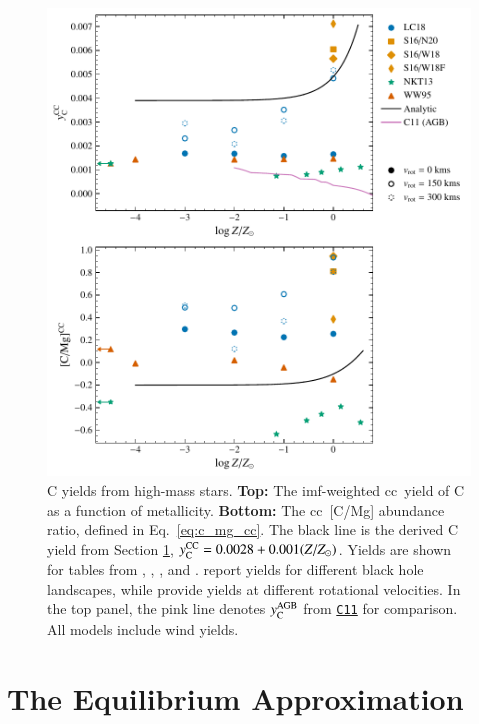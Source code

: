 \documentclass[12pt,oneside,letterpaper]{report}
\newcommand{\cc}{\gls{cc}}
\newcommand{\imf}{\gls{imf}}
\newcommand{\cxi}{\texttt{\hyperlink{C11}{C11}}}
\newcommand{\Ycc}{\ensuremath{y_{\rm C}^{\rm CC}}}
\newcommand{\Ycagb}{\ensuremath{y_{\rm C}^{\rm AGB}}}
\begin{document}
\begin{figure}[htp]
    \centering
    \includegraphics{y_c_cc.pdf}
    \caption[High-Mass Star Carbon Yields]{
        C yields from high-mass stars.
        \textbf{Top:} The \imf-weighted \cc\ yield of C as a function of metallicity.
        \textbf{Bottom:} The \cc\ [C/Mg] abundance ratio, defined in Eq.~\ref{eq:c_mg_cc}. The black line is the derived C yield from Section \ref{sec:equilibrium},
    $\Ycc = 0.0028 + 0.001 (Z/Z_{\odot})$. Yields are shown for tables from 
    \citet[red triangles]{WW95}, \citet[orange squares and diamonds]{sukhbold+16}, 
    \citet[green stars]{NKT13}, and \citet[blue circles]{LC18}. \citet{sukhbold+16} report yields for different black hole landscapes, while \citet{LC18} provide yields at different rotational velocities.
    In the top panel, the pink line denotes $\Ycagb$ from \cxi{} for comparison. All models include wind yields.
}
    \label{fig:y_cc}
\end{figure}

\chapter{The Equilibrium Approximation}\label{sec:equilibrium}
\end{document}

